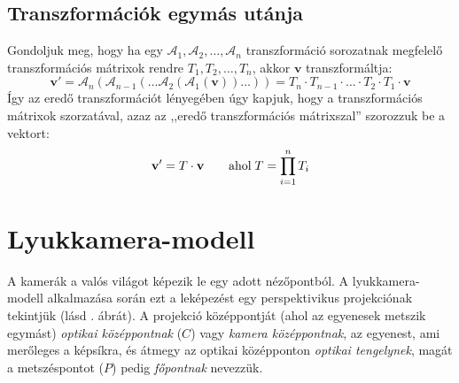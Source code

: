 \subsection{Transzformációk egymás utánja}

Gondoljuk meg, hogy ha egy $\mathcal{A}_1, \mathcal{A}_2, \ldots, \mathcal{A}_n$ transzformáció sorozatnak megfelelő transzformációs mátrixok rendre $T_1, T_2, \ldots, T_n$, akkor $\mathbf{v}$ transzformáltja:
\[\mathbf{v}' = \mathcal{A}_n(\mathcal{A}_{n-1}(\ldots \mathcal{A}_2(\mathcal{A}_1(\mathbf{v}))\ldots)) = T_n \cdot T_{n-1} \cdot \ldots \cdot T_2 \cdot T_1 \cdot \mathbf{v}\]
Így az eredő transzformációt lényegében úgy kapjuk, hogy a transzformációs mátrixok szorzatával, azaz az ,,eredő transzformációs mátrixszal'' szorozzuk be a vektort:
\[\mathbf{v}' = T \cdot \mathbf{v} \qquad \hbox{ahol} \; T = \prod_{i=1}^{n}{T_i}\]

\section{Lyukkamera-modell \label{sec:pinhole}}

A kamerák a valós világot képezik le egy adott nézőpontból. A lyukkamera-modell alkalmazása során ezt a leképezést egy perspektivikus projekciónak tekintjük \cite[2.2. fejezet]{pinhole-model} (lásd . ábrát). A projekció középpontját (ahol az egyenesek metszik egymást) \textit{optikai középpontnak} ($C$) vagy \textit{kamera középpontnak}, az egyenest, ami merőleges a képsíkra, és átmegy az optikai középponton \textit{optikai tengelynek}, magát a metszéspontot ($P$) pedig \textit{főpontnak} nevezzük.

